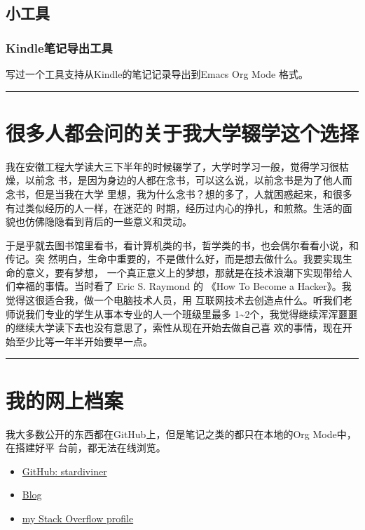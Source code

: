 \documentclass[11pt]{article}
\begin{document}
\subsection{小工具}
\label{sec:org12f5dea}

\subsubsection{Kindle笔记导出工具}
\label{sec:org27589e0}

写过一个工具支持从Kindle的笔记记录导出到Emacs Org Mode 格式。

\noindent\rule{\textwidth}{0.8pt}

\section{很多人都会问的关于我大学辍学这个选择}
\label{sec:org2072a8a}

我在安徽工程大学读大三下半年的时候辍学了，大学时学习一般，觉得学习很枯燥，以前念
书，是因为身边的人都在念书，可以这么说，以前念书是为了他人而念书，但是当我在大学
里想，我为什么念书？想的多了，人就困惑起来，和很多有过类似经历的人一样，在迷茫的
时期，经历过内心的挣扎，和煎熬。生活的面貌也仿佛隐隐看到背后的一些意义和灵动。

于是乎就去图书馆里看书，看计算机类的书，哲学类的书，也会偶尔看看小说，和传记。突
然明白，生命中重要的，不是做什么好，而是想去做什么。我要实现生命的意义，要有梦想，
一个真正意义上的梦想，那就是在技术浪潮下实现带给人们幸福的事情。当时看了 Eric S.
Raymond 的 《How To Become a Hacker》。我觉得这很适合我，做一个电脑技术人员，用
互联网技术去创造点什么。听我们老师说我们专业的学生从事本专业的人一个班级里最多
1\textasciitilde{}2个，我觉得继续浑浑噩噩的继续大学读下去也没有意思了，索性从现在开始去做自己喜
欢的事情，现在开始至少比等一年半开始要早一点。

\noindent\rule{\textwidth}{0.8pt}

\section{我的网上档案}
\label{sec:orge75bed5}

我大多数公开的东西都在GitHub上，但是笔记之类的都只在本地的Org Mode中，在搭建好平
台前，都无法在线浏览。

\begin{itemize}
\item \href{https://github.com/stardiviner/}{GitHub: stardiviner}
\item \href{https://stardiviner.github.io/}{Blog}
\item \href{https://stackexchange.com/users/366399/stardiviner}{my Stack Overflow profile}
\end{itemize}
\end{document}

